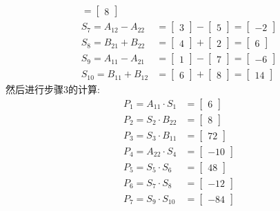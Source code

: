 \documentclass[a4paper,11pt]{article}
\begin{document}
\begin{align*}
	=
	\begin{bmatrix}
	8
	\end{bmatrix} \\	
	S_7 = A_{12}-A_{22} &=
	\begin{bmatrix}
	3
	\end{bmatrix}
	-
	\begin{bmatrix}
	5
	\end{bmatrix}
	=
	\begin{bmatrix}
	-2
	\end{bmatrix} \\	
	S_8 = B_{21}+B_{22} &=
	\begin{bmatrix}
	4
	\end{bmatrix}
	+
	\begin{bmatrix}
	2
	\end{bmatrix}
	=
	\begin{bmatrix}
	6
	\end{bmatrix} \\	
	S_9 = A_{11}-A_{21} &=
	\begin{bmatrix}
	1
	\end{bmatrix}
	-
	\begin{bmatrix}
	7
	\end{bmatrix}
	=
	\begin{bmatrix}
	-6
	\end{bmatrix} \\	
	S_{10} = B_{11}+B_{12} &=
	\begin{bmatrix}
	6
	\end{bmatrix}
	+
	\begin{bmatrix}
	8
	\end{bmatrix}
	=
	\begin{bmatrix}
	14
	\end{bmatrix}
\end{align*}
然后进行步骤3的计算:
\begin{align*}
	P_{1} = A_{11} \cdot S_1 &=
	\begin{bmatrix}
		6
	\end{bmatrix}\\
	P_{2} = S_{2} \cdot B_{22} &=
	\begin{bmatrix}
		8
	\end{bmatrix}\\
	P_{3} =S_{3} \cdot B_{11} &=
	\begin{bmatrix}
		72
	\end{bmatrix}\\
	P_{4} =A_{22} \cdot S_{4} &=
	\begin{bmatrix}
		-10
	\end{bmatrix}\\
	P_{5} =S_{5} \cdot S_{6} &=
	\begin{bmatrix}
		48
	\end{bmatrix}\\
	P_{6} = S_{7} \cdot S_{8} &=
	\begin{bmatrix}
		-12
	\end{bmatrix}\\
	P_{7} = S_{9} \cdot S_{10} &=
	\begin{bmatrix}
		-84
	\end{bmatrix}
\end{align*}
\end{document}
